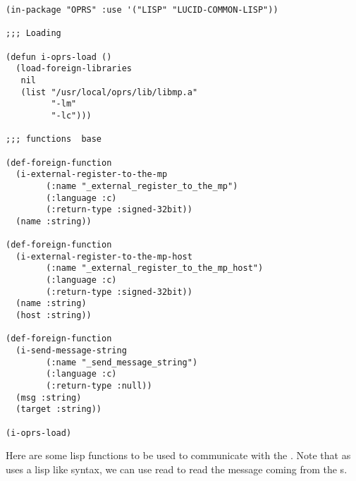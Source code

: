 \begin{verbatim}
(in-package "OPRS" :use '("LISP" "LUCID-COMMON-LISP"))

;;; Loading

(defun i-oprs-load ()
  (load-foreign-libraries
   nil
   (list "/usr/local/oprs/lib/libmp.a"
         "-lm"
         "-lc")))

;;; functions  base

(def-foreign-function
  (i-external-register-to-the-mp
        (:name "_external_register_to_the_mp")
        (:language :c)
        (:return-type :signed-32bit))
  (name :string))

(def-foreign-function
  (i-external-register-to-the-mp-host
        (:name "_external_register_to_the_mp_host")
        (:language :c)
        (:return-type :signed-32bit))
  (name :string)
  (host :string))

(def-foreign-function
  (i-send-message-string
        (:name "_send_message_string")
        (:language :c)
        (:return-type :null))
  (msg :string)
  (target :string))

(i-oprs-load)
\end{verbatim}

Here are some lisp functions to be used to communicate with the
\MPA{}. Note that as \COPRS{} uses a lisp like syntax, we can use read to
read the message coming from the \CPK s.

